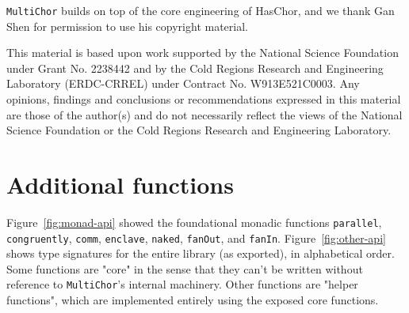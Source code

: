 \documentclass[sigplan,screen]{acmart}
\newcommand{\HasChor}{Has\-Chor\xspace}
\newcommand{\inlinecode}[2][haskell]{\texttt{#2}}
\newcommand{\MultiChor}{\texttt{Multi\-Chor}\xspace}
\begin{document}
\begin{acks}

\MultiChor builds on top of the core engineering of \HasChor,
and we thank Gan Shen for permission to use his copyright material.

This material is based upon work supported by the National Science Foundation under Grant No. 2238442 and by the Cold Regions Research and Engineering Laboratory (ERDC-CRREL)
under Contract No. W913E521C0003. Any opinions, findings and conclusions or recommendations expressed in this material are those of the author(s) and do not necessarily reflect the views of the National Science Foundation or the Cold Regions Research and Engineering Laboratory.
\end{acks}






\clearpage
\appendix

\section{Additional functions}\label{sec:extra-helpers}
Figure~\ref{fig:monad-api} showed the foundational monadic functions
\inlinecode{parallel}, \inlinecode{congruently},
\inlinecode{comm},
\inlinecode{enclave}, \inlinecode{naked}, \inlinecode{fanOut},
and \inlinecode{fanIn}.
Figure~\ref{fig:other-api} shows type signatures for the entire
library (as exported), in alphabetical order.
Some functions are "core" in the sense that they can't be written
without reference to \MultiChor's internal machinery.
Other functions are "helper functions",
which are implemented entirely using the exposed core functions.
\end{document}
